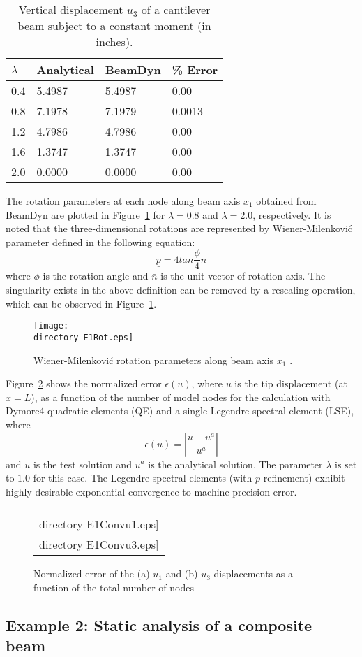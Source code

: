 \documentclass{aiaa-tc}
\def\directory{EPSF/}
\renewcommand{\vec}[1]{\underline{#1}}
\begin{document}
\begin{table}[tbp]
\centering 
\caption{Vertical displacement $u_3$ of a cantilever beam subject to a constant moment (in inches).}
\label{E1u3} 
	\begin{tabular}{| l | l | l | l |}
    	\hline
    	$\lambda$ & Analytical & BeamDyn & \% Error \\ \hline
    	0.4       & 5.4987     & 5.4987  & 0.00   \\ \hline
    	0.8       & 7.1978     & 7.1979  & 0.0013   \\ \hline
    	1.2       & 4.7986     & 4.7986  & 0.00   \\ \hline
    	1.6       & 1.3747     & 1.3747  & 0.00   \\ \hline
    	2.0       & 0.0000     & 0.0000  & 0.00   \\ \hline
    \end{tabular}
 \end{table}
 The rotation parameters at each node along beam axis $x_1$ obtained from BeamDyn are plotted in Figure~\ref{E1Rot} for $\lambda = 0.8$ and $\lambda = 2.0$, respectively. It is noted that the three-dimensional rotations are represented by Wiener-Milenkovi\'c parameter defined in the following equation:
 \begin{equation}
     \vec{p} = 4 tan\frac{\phi}{4} \bar{n}
     \label{WMParameter}
 \end{equation}
 where $\phi$ is the rotation angle and $\bar{n}$ is the unit vector of rotation axis. The singularity exists in the above definition can be removed by a rescaling operation, which can be observed in Figure~\ref{E1Rot}.
\begin{figure}
    \centering
    \texttt{[image: \\directory E1Rot.eps]}
    \caption{Wiener-Milenkovi\'c rotation parameters along beam axis $x_1$ .}
    \label{E1Rot}
\end{figure}
Figure~\ref{E1Conv} shows the normalized error $\epsilon(u)$, where $u$ is the tip displacement (at $x=L$), as a function of the number of model nodes for the calculation with Dymore4 quadratic elements (QE) and a single Legendre spectral element (LSE), where
\begin{equation}
    \label{E1Error}
    \epsilon(u) = \left| \frac{u-u^a}{u^a} \right|
\end{equation}
and $u$ is the test solution and $u^a$ is the analytical solution. The parameter $\lambda$ is set to $1.0$ for this case. The Legendre spectral elements (with $p$-refinement) exhibit highly desirable exponential convergence to machine precision error.
\begin{figure}
    \centering
    \begin{tabular}{c}
    \subfloat[$u_1$]{\label{E1Conv:u1}\texttt{[image: \\directory  E1Convu1.eps]}} \qquad
\subfloat[$u_3$]{\label{E1Conv:u3}\texttt{[image: \\directory  E1Convu3.eps]}}\\
\end{tabular}
\caption{Normalized error of the (a) $u_1$ and (b) $u_3$ displacements as a function of the total number of nodes}
\label{E1Conv}
\end{figure}

\subsection{Example 2: Static analysis of a composite beam}

 



\end{document}
